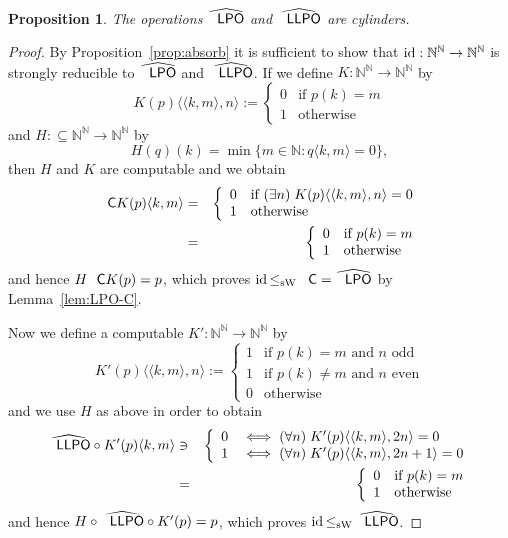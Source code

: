\documentclass[jsl,10pt]{noasl}
\def\IN{{\mathbb{N}}}
\def\In{\subseteq}
\def\id{{\rm id}}
\def\LPO{\text{\rm\sffamily LPO}}
\def\LLPO{\text{\rm\sffamily LLPO}}
\def\C{\text{\rm\sffamily C}}
\def\LPO{\text{\rm\sffamily LPO}}
\def\LLPO{\text{\rm\sffamily LLPO}}
\def\leqSW{\mathop{\leq_{\mathrm{sW}}}}
\newtheorem{proposition}{Proposition}[section]
\begin{document}
\begin{proposition}
\label{prop:LLPO-cylinder}
The operations $\widehat{\LPO}$ and $\widehat{\LLPO}$ are cylinders.
\end{proposition}
\begin{proof}
By Proposition~\ref{prop:absorb} it is sufficient to show that
$\id:\IN^\IN\to\IN^\IN$ is strongly reducible to $\widehat{\LPO}$ and $\widehat{\LLPO}$. 
If we define $K:\IN^\IN\to\IN^\IN$ by
\[K(p)\langle\langle k,m\rangle, n\rangle:=\left\{\begin{array}{ll}
  0 & \mbox{if $p(k)=m$}\\
  1 & \mbox{otherwise}
\end{array}\right.\]
and $H:\In\IN^\IN\to\IN^\IN$ by
\[H(q)(k)=\min\{m\in\IN:q\langle k,m\rangle=0\},\]
then $H$ and $K$ are computable and we obtain
\begin{eqnarray*}
\C K(p)\langle k,m\rangle
&=& \left\{\begin{array}{ll}
    0 & \mbox{if $(\exists n)\;K(p)\langle\langle k,m\rangle, n\rangle=0$}\\
    1 & \mbox{otherwise}
    \end{array}\right.\\
&=& \left\{\begin{array}{ll}
    0 & \mbox{if $p(k)=m$}\\
    1 & \mbox{otherwise}
    \end{array}\right.
\end{eqnarray*}
and hence $H\C K(p)=p$, which proves $\id\leqSW\C=\widehat{\LPO}$ by Lemma~\ref{lem:LPO-C}.

Now we define a computable $K':\IN^\IN\to\IN^\IN$ by
\[K'(p)\langle\langle k,m\rangle, n\rangle:=\left\{\begin{array}{ll}
  1 & \mbox{if $p(k)=m$ and $n$ odd}\\
  1 & \mbox{if $p(k)\not=m$ and $n$ even}\\
  0 & \mbox{otherwise}
\end{array}\right.\]
and we use $H$ as above in order to obtain
\begin{eqnarray*}
\widehat{\LLPO}\circ K'(p)\langle k,m\rangle
&\ni& \left\{\begin{array}{ll}
    0 & \iff(\forall n)\;K'(p)\langle\langle k,m\rangle, 2n\rangle=0\\
    1 & \iff(\forall n)\;K'(p)\langle\langle k,m\rangle, 2n+1\rangle=0
    \end{array}\right.\\
&=& \left\{\begin{array}{ll}
    0 & \mbox{if $p(k)=m$}\\
    1 & \mbox{otherwise}
    \end{array}\right.\\
\end{eqnarray*}
and hence $H\circ\widehat{\LLPO}\circ K'(p)=p$, which proves $\id\leqSW\widehat{\LLPO}$.
\end{proof}
\end{document}
